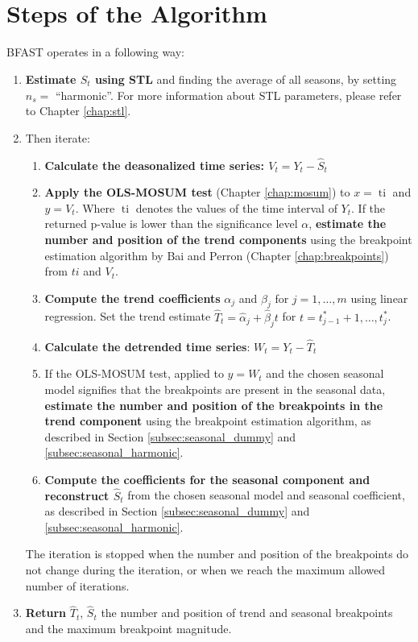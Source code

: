 \documentclass[main.tex]{subfiles}
\begin{document}
\section{Steps of the Algorithm}
\label{sec:bfast_algorithm_steps}
BFAST operates in a following way:
\begin{enumerate}
\item \textbf{Estimate $\hat{S}_t$ using STL} and finding the average of all seasons, by
  setting $n_s =$ ``harmonic''. For more information about STL parameters,
  please refer to Chapter \ref{chap:stl}.
\item Then iterate:
  \begin{enumerate}[1)]
    \item \textbf{Calculate the deasonalized time series: $V_t = Y_t - \hat{S}_t$}
    \item \textbf{Apply the OLS-MOSUM test} (Chapter \ref{chap:mosum}) to $x=\operatorname{ti}$ and
      $y = V_t$. Where $\operatorname{ti}$ denotes the values of the time interval of $Y_t$.
      If the returned p-value is lower than the significance level $\alpha$,
      \textbf{estimate the number and position of the trend components} using the
      breakpoint estimation algorithm by Bai and Perron (Chapter
      \ref{chap:breakpoints}) from $ti$ and $V_t$.
    \item \textbf{Compute the trend coefficients} $\alpha_j$ and $\beta_j$ for
      $j = 1, \hdots, m$ using linear regression. Set the trend estimate
      $\hat{T}_t = \hat{\alpha}_j + \hat{\beta}_j t$ for
      $t = t^*_{j-1} + 1, \hdots, t^*_j$.
    \item \textbf{Calculate the detrended time series}: $W_t = Y_t - \hat{T}_t$
    \item If the OLS-MOSUM test, applied to $y=W_t$ and
      the chosen seasonal model signifies that the breakpoints are present in the
      seasonal data, \textbf{estimate the number and position of the
      breakpoints in the trend component} using the breakpoint estimation
      algorithm, as described in Section \ref{subsec:seasonal_dummy} and
      \ref{subsec:seasonal_harmonic}.
    \item \textbf{Compute the coefficients for the seasonal component
      and reconstruct $\hat{S}_t$} from the chosen seasonal model and seasonal
      coefficient, as described in Section \ref{subsec:seasonal_dummy} and
      \ref{subsec:seasonal_harmonic}.
  \end{enumerate}
  The iteration is stopped when the number and position of the breakpoints do
  not change during the iteration, or when we reach the maximum allowed number of iterations.
\item \textbf{Return} $\hat{T}_t$, $\hat{S}_t$ the number and position of trend and
  seasonal breakpoints and the maximum breakpoint magnitude.
\end{enumerate}
\end{document}

